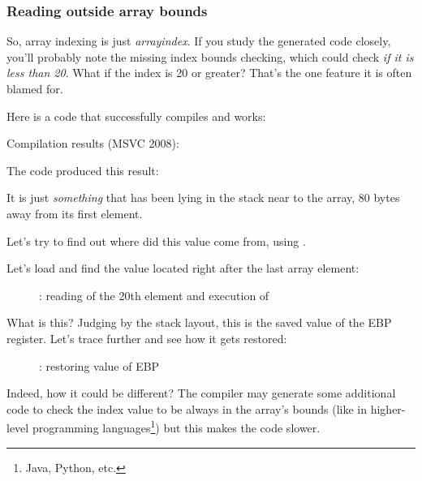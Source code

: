 \subsubsection{Reading outside array bounds}

So, array indexing is just \emph{array\lbrack{}index\rbrack}.
If you study the generated code closely, you'll probably note the missing index bounds checking,
which could check \emph{if it is less than 20}.
What if the index is 20 or greater?
That's the one \CCpp feature it is often blamed for.

Here is a code that successfully compiles and works:



Compilation results (MSVC 2008):



The code produced this result:



It is just \emph{something} that has been lying in the stack near to the array, 80 bytes away from its first element.

\clearpage
\myindex{\olly}
Let's try to find out where did this value come from, using \olly.

Let's load and find the value located right after the last array element:

\begin{figure}[H]
\centering
{}
\caption{\olly: reading of the 20th element and execution of \printf}
\label{fig:array_BO_olly_r1}
\end{figure}

What is this? 
Judging by the stack layout,
this is the saved value of the EBP register.
\clearpage
Let's trace further and see how it gets restored:

\begin{figure}[H]
\centering
{}
\caption{\olly: restoring value of EBP}
\label{fig:array_BO_olly_r2}
\end{figure}

Indeed, how it could be different?
The compiler may generate some additional code to check the index value to be always
in the array's bounds (like in higher-level programming languages\footnote{Java, Python, etc.})
but this makes the code slower.

